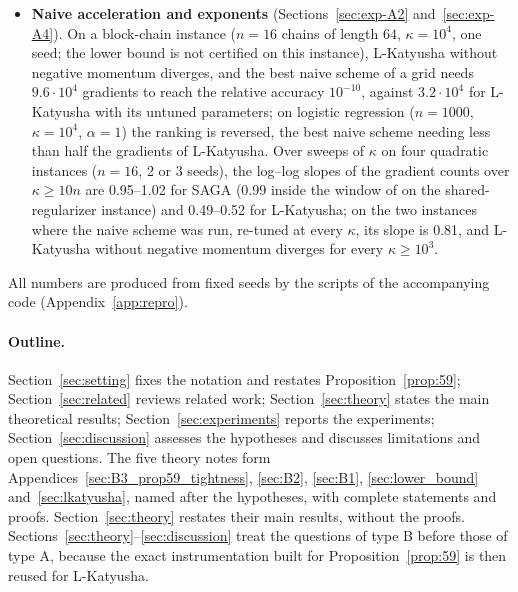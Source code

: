\begin{itemize}[leftmargin=1.4em,itemsep=1pt,topsep=2pt]
\item \textbf{Naive acceleration and exponents} (Sections~\ref{sec:exp-A2} and~\ref{sec:exp-A4}). On a block-chain
instance ($n=16$ chains of length $64$, $\kappa=10^4$, one seed; the lower bound is not certified on this instance),
L-Katyusha without negative momentum diverges, and the best naive scheme of a grid needs $9.6\cdot10^4$
gradients to reach the relative accuracy $10^{-10}$, against $3.2\cdot10^4$ for L-Katyusha with its untuned
parameters; on logistic regression ($n=1000$, $\kappa=10^4$, $\alpha=1$) the ranking is reversed, the best naive
scheme needing less than half the gradients of L-Katyusha. Over sweeps of $\kappa$ on four quadratic instances
($n=16$, 2 or 3 seeds), the log--log slopes of the gradient counts over $\kappa\ge10n$ are 0.95--1.02 for SAGA (0.99
inside the window of  on the shared-regularizer instance) and 0.49--0.52 for L-Katyusha; on the two
instances where the naive scheme was run, re-tuned at every $\kappa$, its slope is 0.81, and L-Katyusha without
negative momentum diverges for every $\kappa\ge10^3$.
\end{itemize}
All numbers are produced from fixed seeds by the scripts of the accompanying code (Appendix~\ref{app:repro}).

\paragraph{Outline.}
Section~\ref{sec:setting} fixes the notation and restates Proposition~\ref{prop:59}; Section~\ref{sec:related} reviews
related work; Section~\ref{sec:theory} states the main theoretical results; Section~\ref{sec:experiments} reports the
experiments; Section~\ref{sec:discussion} assesses the hypotheses and discusses limitations and open questions. The
five theory notes form Appendices~\ref{sec:B3_prop59_tightness}, \ref{sec:B2}, \ref{sec:B1}, \ref{sec:lower_bound}
and~\ref{sec:lkatyusha}, named after the hypotheses, with complete statements and proofs. Section~\ref{sec:theory}
restates their main results, without the proofs.
Sections~\ref{sec:theory}--\ref{sec:discussion} treat the questions of type B before those of type A, because the exact
instrumentation built for Proposition~\ref{prop:59} is then reused for L-Katyusha.
